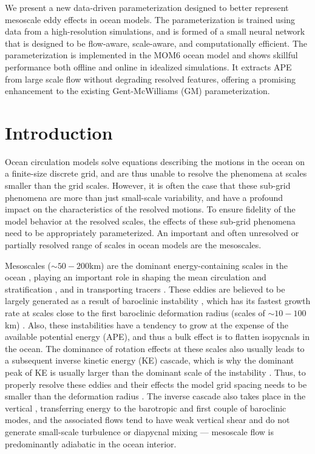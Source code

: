 \documentclass[draft]{agujournal2019}
\begin{document}
We present a new data-driven parameterization designed to better represent mesoscale eddy effects in ocean models. The parameterization is trained using data from a high-resolution simulations, and is formed of a small neural network that is designed to be flow-aware, scale-aware, and computationally efficient. The parameterization is implemented in the MOM6 ocean model and shows skillful performance both offline and online in idealized simulations. It extracts APE from large scale flow without degrading resolved features, offering a promising enhancement to the existing Gent-McWilliams (GM) parameterization.

%
%

\section{Introduction}
Ocean circulation models solve equations describing the motions in the ocean on a finite-size discrete grid, and are thus unable to resolve the phenomena at scales smaller than the grid scales. However, it is often the case that these sub-grid phenomena are more than just small-scale variability, and have a profound impact on the characteristics of the resolved motions. To ensure fidelity of the model behavior at the resolved scales, the effects of these sub-grid phenomena need to be appropriately parameterized. An important and often unresolved or partially resolved range of scales in ocean models are the mesoscales. 

Mesoscales ($\sim50-200$km) are the dominant energy-containing scales in the ocean \cite{ferrari2009ocean}, playing an important role in shaping the mean circulation and stratification \cite{gent2011gent}, and in transporting tracers \cite{meredith2021ocean}. These eddies are believed to be largely generated as a result of baroclinic instability \cite{killworth1997parameterization, smith2007geography}, which has its fastest growth rate at scales close to the first baroclinic deformation radius (scales of $\sim10-100$km) \cite{chelton1998geographical, tulloch2011scales}. Also, these instabilities have a tendency to grow at the expense of the available potential energy (APE), and thus a bulk effect is to flatten isopycnals in the ocean. The dominance of rotation effects at these scales also usually leads to a subsequent inverse kinetic energy (KE) cascade, which is why the dominant peak of KE is usually larger than the dominant scale of the instability \cite{tulloch2011scales}. 
Thus, to properly resolve these eddies and their effects the model grid spacing needs to be smaller than the deformation radius \cite{hallberg2013using}. The inverse cascade also takes place in the vertical \cite{smith2002scales}, transferring energy to the barotropic and first couple of baroclinic modes, and the associated flows tend to have weak vertical shear and do not generate small-scale turbulence or diapycnal mixing --- mesoscale flow is predominantly adiabatic in the ocean interior. 
\end{document}
